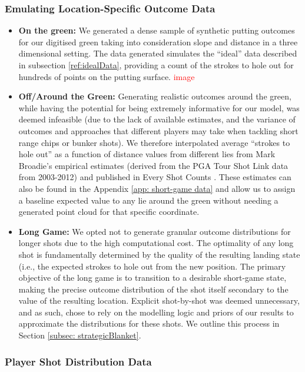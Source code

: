 \documentclass[11pt, letterpaper]{article}
\begin{document}
\subsubsection{Emulating Location-Specific Outcome Data}
\label{subsec: greendata}
\begin{itemize}
    \item \textbf{On the green:} We generated a dense sample of synthetic putting outcomes for our digitised green taking into consideration slope and distance in a three dimensional setting. The data generated simulates the ``ideal'' data described in subsection \ref{ref:idealData}, providing a count of the strokes to hole out for hundreds of points on the putting surface. \textcolor{red}{image}

    \item \textbf{Off/Around the Green:} Generating realistic outcomes around the green, while having the potential for being extremely informative for our model, was deemed infeasible (due to the lack of available estimates, and the variance of outcomes and approaches that different players may take when tackling short range chips or bunker shots). We therefore interpolated average ``strokes to hole out'' as a function of distance values from different lies from Mark Broadie's empirical estimates (derived from the PGA Tour Shot Link data from 2003-2012) and published in  Every Shot Counts \parencite{Broadie_2014a}. These estimates can also be found in the Appendix \ref{app: short-game data} and allow us to assign a baseline expected value to any lie around the green without needing a generated point cloud for that specific coordinate.
    
\item \textbf{Long Game:} We opted not to generate granular outcome distributions for longer shots due to the high computational cost. The optimality of any long shot is fundamentally determined by the quality of the resulting landing state (i.e., the expected strokes to hole out from the new position. The primary objective of the long game is to transition to a desirable short-game state, making the precise outcome distribution of the shot itself secondary to the value of the resulting location. Explicit shot-by-shot was deemed unnecessary, and as such, chose to rely on the modelling logic and priors of our results to approximate the distributions for these shots. We outline this process in Section \ref{subsec: strategicBlanket}.
\end{itemize}

\subsubsection{Player Shot Distribution Data}
\end{document}
